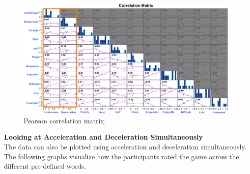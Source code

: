 




\begin{figure}[htbp]
\centering
\includegraphics[width=0.98\textwidth]{Pics/correlationMatrix_final}
\caption{Pearson correlation matrix.}
\label{fig:correlationMatrix}
\end{figure}

\textbf{Looking at Acceleration and Deceleration Simultaneously}\\
The data can also be plotted using acceleration and deceleration simultaneously. The following graphs visualize how the participants rated the game across the different pre-defined words.

